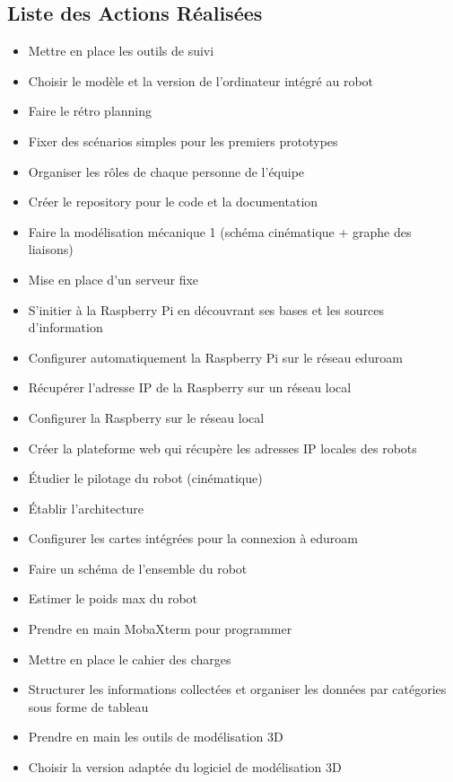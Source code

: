 \documentclass[a4paper,12pt]{report}  %
\begin{document}
\subsection{Liste des Actions Réalisées}

\begin{itemize}
	\item Mettre en place les outils de suivi
	\item Choisir le modèle et la version de l'ordinateur intégré au robot
	\item Faire le rétro planning
	\item Fixer des scénarios simples pour les premiers prototypes
	\item Organiser les rôles de chaque personne de l'équipe
	\item Créer le repository pour le code et la documentation
	\item Faire la modélisation mécanique 1 (schéma cinématique + graphe des liaisons)
	\item Mise en place d'un serveur fixe 
	\item S’initier à la Raspberry Pi en découvrant ses bases et les sources d'information
	\item Configurer automatiquement la Raspberry Pi sur le réseau eduroam 
	\item Récupérer l'adresse IP de la Raspberry sur un réseau local
	\item Configurer la Raspberry sur le réseau local
	\item Créer la plateforme web qui récupère les adresses IP locales des robots
	\item Étudier le pilotage du robot (cinématique)
	\item Établir l'architecture
	\item Configurer les cartes intégrées pour la connexion à eduroam 
	\item Faire un schéma de l'ensemble du robot 
	\item Estimer le poids max du robot 
	\item Prendre en main MobaXterm pour programmer
	\item Mettre en place le cahier des charges
	\item Structurer les informations collectées et organiser les données par catégories sous forme de tableau
	\item Prendre en main les outils de modélisation 3D
	\item Choisir la version adaptée du logiciel de modélisation 3D

\end{itemize}
\end{document}
